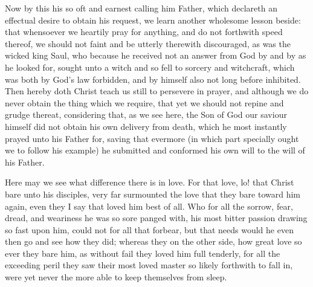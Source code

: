 \documentclass[a5paper]{scrbook}
\begin{document}
	Now by this his so oft and earnest calling him Father, which declareth an effectual desire to obtain his request, we learn another wholesome lesson beside: that whensoever we heartily pray for anything, and do not forthwith speed thereof, we should not faint and be utterly therewith discouraged, as was the wicked king Saul, who because he received not an answer from God by and by as he looked for, sought unto a witch and so fell to sorcery and witchcraft, which was both by God's law forbidden, and by himself also not long before inhibited. Then hereby doth Christ teach us still to persevere in prayer, and although we do never obtain the thing which we require, that yet we should not repine and grudge thereat, considering that, as we see here, the Son of God our saviour himself did not obtain his own delivery from death, which he most instantly prayed unto his Father for, saving that evermore (in which part specially ought we to follow his example) he submitted and conformed his own will to the will of his Father.
	
	 Here may we see what difference there is in love. For that love, lo! that Christ bare unto his disciples, very far surmounted the love that they bare toward him again, even they I say that loved him best of all. Who for all the sorrow, fear, dread, and weariness he was so sore panged with, his most bitter passion drawing so fast upon him, could not for all that forbear, but that needs would he even then go and see how they did; whereas they on the other side, how great love so ever they bare him, as without fail they loved him full tenderly, for all the exceeding peril they saw their most loved master so likely forthwith to fall in, were yet never the more able to keep themselves from sleep.
	
	
	
	
\end{document}
